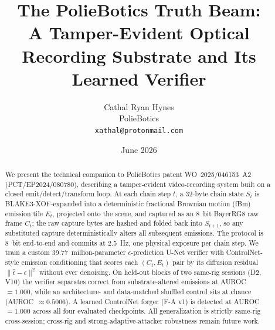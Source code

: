\documentclass[11pt]{article}
\title{\textbf{The PolieBotics Truth Beam:\\[2pt] A Tamper-Evident Optical Recording Substrate and Its Learned Verifier}}
\author{Cathal Ryan Hynes\\[2pt]
  \normalsize PolieBotics\\[1pt]
  \normalsize \texttt{xathal@protonmail.com}}
\date{June 2026}
\begin{document}
\maketitle

\begin{abstract}
\noindent\small
We present the technical companion to PolieBotics patent WO~2025/046153~A2 (PCT/EP2024/080780), describing a tamper-evident video-recording system built on a closed emit/detect/transform loop. At each chain step $t$, a 32-byte chain state $S_t$ is BLAKE3-XOF-expanded into a deterministic fractional Brownian motion (fBm) emission tile $E_t$, projected onto the scene, and captured as an \SI{8}{bit} BayerRG8 raw frame $C_t$; the raw capture bytes are hashed and folded back into $S_{t+1}$, so any substituted capture deterministically alters all subsequent emissions. The protocol is \SI{8}{bit} end-to-end and commits at \SI{2.5}{\hertz}, one physical exposure per chain step. We train a custom \num{39.77}~million-parameter $\epsilon$-prediction U-Net verifier with ControlNet-style emission conditioning that scores each $(C_t, E_t)$ pair by its diffusion residual $\lVert \hat{\epsilon}-\epsilon\rVert^2$ without ever denoising. On held-out blocks of two same-rig sessions (D2, V10) the verifier separates correct from substrate-altered emissions at AUROC~$=1.000$, while an architecture- and data-matched shuffled control sits at chance (AUROC~$\approx 0.5006$). A learned ControlNet forger (F-A v1) is detected at AUROC~$=1.000$ across all four evaluated checkpoints. All generalization is strictly same-rig cross-session; cross-rig and strong-adaptive-attacker robustness remain future work.
\end{abstract}

\tableofcontents
\bigskip















\end{document}
